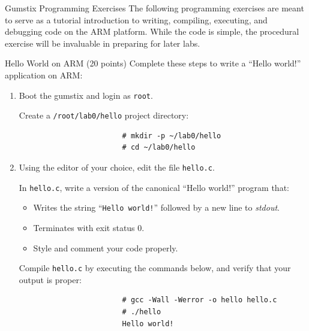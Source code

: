 \documentclass{article}
\begin{document}
	\begin{section}{Gumstix Programming Exercises}
		The following programming exercises are meant to serve as a tutorial
		introduction to writing, compiling, executing, and debugging code on the
		ARM platform.  While the code is simple, the procedural exercise will be
		invaluable in preparing for later labs.

		\begin{subsection}{Hello World on ARM (20 points)} \label{helloworld}
			Complete these steps to write a ``Hello world!'' application on ARM:
			\begin{enumerate}
				\item Boot the gumstix and login as \texttt{root}.

				\begin{item}
					Create a \texttt{/root/lab0/hello} project directory:
					\begin{verbatim}
						# mkdir -p ~/lab0/hello
						# cd ~/lab0/hello
					\end{verbatim}
				\end{item}

				\item Using the editor of your choice, edit the file \texttt{hello.c}.

				\begin{item}
					In \texttt{hello.c}, write a version of the canonical ``Hello world!''
					program that:
					\begin{itemize}
						\item Writes the string ``\texttt{Hello world!}'' followed by a new line to
						      \emph{stdout}.
						\item Terminates with exit status 0.
						\item Style and comment your code properly.
					\end{itemize}
				\end{item}

				\begin{item}
					Compile \texttt{hello.c} by executing the commands below, and verify that
					your output is proper:
					\begin{verbatim}
						# gcc -Wall -Werror -o hello hello.c
						# ./hello
						Hello world!
					\end{verbatim}
				\end{item}
			\end{enumerate}
		\end{subsection}


\end{section}
\end{document}
